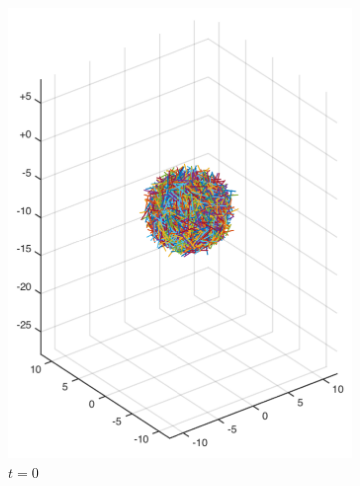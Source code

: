 \documentclass[a4paper,11pt]{kth-mag}
\begin{document}
\begin{figure}[!htbp]
  \centering
  \begin{subfigure}[h]{0.4\textwidth}
    \centering
    \includegraphics[width=\textwidth]{img/state_00000.pdf}
    \caption{$t=0$}\label{fig:sphere_simulation_1a}
  \end{subfigure}
  \begin{subfigure}[h]{0.4\textwidth}
    \centering

\end{subfigure}
\end{figure}
\end{document}
